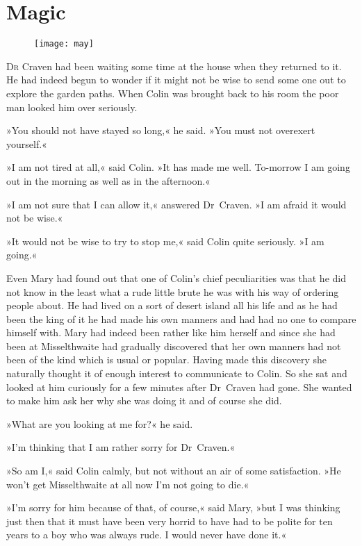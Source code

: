 \chapter{Magic} 
	
\begin{figure}[t!]
\centering
\texttt{[image: may]}
\end{figure}

	\lettrine[lines=6]{D}{r} Craven had been waiting some time at the house when they returned to it. He had indeed begun to wonder if it might not be wise to send some one out to explore the garden paths. When Colin was brought back to his room the poor man looked him over seriously.

\zz
»You should not have stayed so long,« he said. »You must not overexert yourself.«

»I am not tired at all,« said Colin. »It has made me well. To-morrow I am going out in the morning as well as in the afternoon.«

»I am not sure that I can allow it,« answered Dr~Craven. »I am afraid it would not be wise.«

»It would not be wise to try to stop me,« said Colin quite seriously. »I am going.«

Even Mary had found out that one of Colin's chief peculiarities was that he did not know in the least what a rude little brute he was with his way of ordering people about. He had lived on a sort of desert island all his life and as he had been the king of it he had made his own manners and had had no one to compare himself with. Mary had indeed been rather like him herself and since she had been at Misselthwaite had gradually discovered that her own manners had not been of the kind which is usual or popular. Having made this discovery she naturally thought it of enough interest to communicate to Colin. So she sat and looked at him curiously for a few minutes after Dr~Craven had gone. She wanted to make him ask her why she was doing it and of course she did.

»What are you looking at me for?« he said.

»I'm thinking that I am rather sorry for Dr~Craven.«

»So am I,« said Colin calmly, but not without an air of some satisfaction. »He won't get Misselthwaite at all now I'm not going to die.«

»I'm sorry for him because of that, of course,« said Mary, »but I was thinking just then that it must have been very horrid to have had to be polite for ten years to a boy who was always rude. I would never have done it.«

